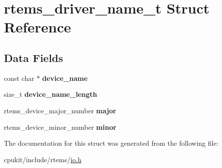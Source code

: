 \hypertarget{structrtems__driver__name__t}{}\section{rtems\+\_\+driver\+\_\+name\+\_\+t Struct Reference}
\label{structrtems__driver__name__t}
\subsection*{Data Fields}
\begin{DoxyCompactItemize}
\item 
\mbox{\label{structrtems__driver__name__t_a8c473be8822bfe08d0ab042fbd5ad4df}} 
const char $\ast$ {\bfseries device\+\_\+name}
\item 
\mbox{\label{structrtems__driver__name__t_aabd96dad6e3b8588ee3f818586af6c27}} 
size\+\_\+t {\bfseries device\+\_\+name\+\_\+length}
\item 
\mbox{\label{structrtems__driver__name__t_a22cb9b5fb1c4acf1ac687c16f03bf065}} 
rtems\+\_\+device\+\_\+major\+\_\+number {\bfseries major}
\item 
\mbox{\label{structrtems__driver__name__t_ac59772e0bc192fa15881616f880479ad}} 
rtems\+\_\+device\+\_\+minor\+\_\+number {\bfseries minor}
\end{DoxyCompactItemize}


The documentation for this struct was generated from the following file\+:\begin{DoxyCompactItemize}
\item 
cpukit/include/rtems/\mbox{\hyperlink{cpukit_2include_2rtems_2io_8h}{io.\+h}}\end{DoxyCompactItemize}
